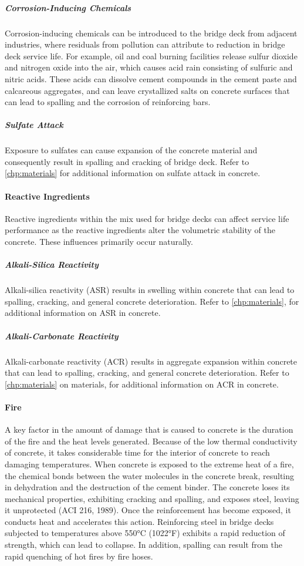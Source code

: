\subparagraph*{Corrosion-Inducing Chemicals}
Corrosion-inducing chemicals can be introduced to the bridge deck from
adjacent industries, where residuals from pollution can attribute to reduction in bridge deck service life. For example,
oil and coal burning facilities release sulfur dioxide and nitrogen oxide into the air, which causes acid rain consisting
of sulfuric and nitric acids. These acids can dissolve cement compounds in the cement paste and calcareous
aggregates, and can leave crystallized salts on concrete surfaces that can lead to spalling and the corrosion of
reinforcing bars.
\subparagraph*{Sulfate Attack}
Exposure to sulfates can cause expansion of the concrete material and consequently result in
spalling and cracking of bridge deck. Refer to \cref{chp:materials} for additional information on sulfate attack in concrete.

\paragraph{Reactive Ingredients}
Reactive ingredients within the mix used for bridge decks can affect service life performance as the reactive
ingredients alter the volumetric stability of the concrete. These influences primarily occur naturally.
\subparagraph*{Alkali-Silica Reactivity}
Alkali-silica reactivity (ASR) results in swelling within concrete that can lead to spalling, cracking, and general concrete deterioration. Refer to \cref{chp:materials}, for additional information on ASR in concrete.

\subparagraph*{Alkali-Carbonate Reactivity}
Alkali-carbonate reactivity (ACR) results in aggregate expansion within concrete that can lead to spalling, cracking, and general concrete deterioration. Refer to \cref{chp:materials} on materials, for additional information on ACR in concrete.

\paragraph{Fire}
A key factor in the amount of damage that is caused to concrete is the duration of the fire and the heat levels
generated. Because of the low thermal conductivity of concrete, it takes considerable time for the interior of concrete
to reach damaging temperatures. When concrete is exposed to the extreme heat of a fire, the chemical bonds between
the water molecules in the concrete break, resulting in dehydration and the destruction of the cement binder. The
concrete loses its mechanical properties, exhibiting cracking and spalling, and exposes steel, leaving it unprotected (ACI 216, 1989). Once the reinforcement has become exposed, it conducts heat and accelerates this action.
Reinforcing steel in bridge decks subjected to temperatures above 550°C (1022°F) exhibits a rapid reduction of
strength, which can lead to collapse. In addition, spalling can result from the rapid quenching of hot fires by fire
hoses.

